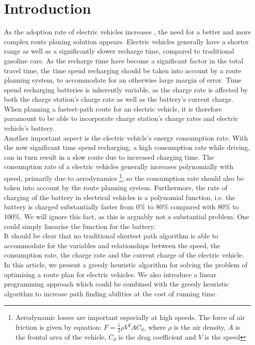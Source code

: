 \section{Introduction}

As the adoption rate of electric vehicles increases \cite{Henry2013}, the need for a better and more complex route planing solution appears. Electric vehicles generally have a shorter range as well as a significantly slower recharge time, compared to traditional gasoline cars. As the recharge time have become a significant factor in the total travel time, the time spend recharging should be taken into account by a route planning system, to accommodate for an otherwise large margin of error. Time spend recharging batteries is inherently variable, as the charge rate is affected by both the charge station's charge rate as well as the battery's current charge. When planning a fastest-path route for an electric vehicle, it is therefore paramount to be able to incorporate charge station's charge rates and electric vehicle's battery.\\

Another important aspect is the electric vehicle's energy consumption rate. With the now significant time spend recharging, a high consumption rate while driving, can in turn result in a slow route due to increased charging time. The consumption rate of a electric vehicles generally increases polynomially with speed, primarily due to aerodynamics \footnote{Aerodynamic losses are important especially at high speeds. The force of air friction is given by equation: $F = \frac{1}{2} \rho V^2 A C_d$, where $\rho$ is the air density, $A$ is the frontal area of the vehicle, $C_d$ is the drag coefficient and $V$ is the speed}, so the consumption rate should also be taken into account by the route planning system. Furthermore, the rate of charging of the battery in electrical vehicles is a polynomial function, i.e. the battery is charged substantially faster from 0\% to 80\% compared with 80\% to 100\%. We will ignore this fact, as this is arguably not a substantial problem. One could simply linearise the function for the battery.\\

It should be clear that no traditional shortest path algorithm is able to accommodate for the variables and relationships between the speed, the consumption rate, the charge rate and the current charge of the electric vehicle. In this article, we present a greedy heuristic algorithm for solving the problem of optimising a route plan for electric vehicles. We also introduce a linear programming approach which could be combined with the greedy heuristic algorithm to increase path finding abilities at the cost of running time.  




